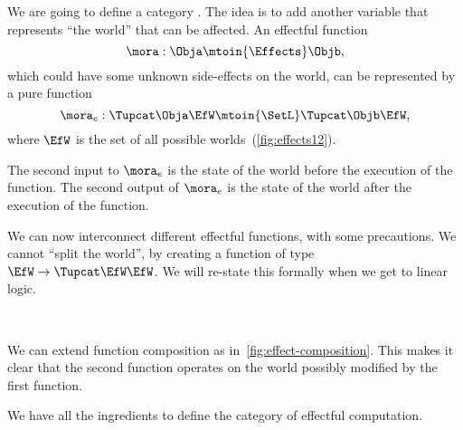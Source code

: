 We are going to define a category \Effects.
The idea is to add another variable that represents ``the world'' that can be affected.
An effectful function
%
\begin{equation}
	\mora: \Obja \mtoin{\Effects} \Objb,
\end{equation}
%
which could have some unknown side-effects on the world, can be represented by a pure function
%
\begin{equation}
	\mora_e:  \Tupcat \Obja   \EfW \mtoin{\SetL}   \Tupcat  \Objb \EfW,
\end{equation}
%
where $\EfW$ is the set of all possible worlds~(\cref{fig:effects12}).

The second input to $\mora_e$ is the state of the world before the execution of the function.
The second output of $\mora_e$ is the state of the world after the execution of the function.

We can now interconnect different effectful functions, with some precautions.
We cannot ``split the world'', by creating a function of type $\EfW \to \Tupcat \EfW \EfW$.
We will re-state this formally when we get to linear logic.

\begin{marginfigure}
	\centering
	\\
	\caption{}
	\label{fig:effect-composition}
\end{marginfigure}

We can extend function composition as in~\cref{fig:effect-composition}.
This makes it clear that the second function operates on the world possibly modified by the first function.

We have all the ingredients to define the category \Effects of effectful computation.

